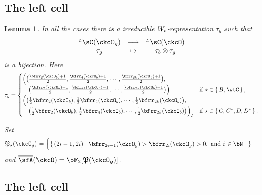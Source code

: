 \documentclass[12pt,a4paper]{amsart}
\def\abs#1{\left|{#1}\right|}
\newcommand{\CQ}{{\mathcal {Q}}}
\numberwithin{equation}{section}
\newtheorem{lem}[thm]{Lemma}
\theoremstyle{remark}
\def\half{{\tfrac{1}{2}}}
\def\WLamck{W_{[\lambda_{\ckcO}]}}
\def\LC{{}^{\scriptscriptstyle L}\sC}
\def\CQ{\overline{\sfA}}%
\def\CPP{\mathfrak{P}}
\def\CPPs{\mathfrak{P}_{\star}}
\begin{document}
  \subsection{The left cell}

\begin{lem}\label{lem:Lcell}
  In all the cases there is a irreducible $W_{b}$-representation $\tau_{b}$
  such that
  \[
    \begin{array}{ccc}
      \LC(\ckcO_{g}) & \longrightarrow & \LC(\ckcO)\\
      \tau_g & \mapsto & \tau_{b}\otimes \tau_{g}
    \end{array}
  \]
  is a bijection.
  Here
  \[
    \tau_{b} = \begin{cases}
      \Big( \big(\frac{\bfrr_{2}(\ckcO_{b})+1}{2}, \frac{\bfrr_{4}(\ckcO_{b})+1}{2}, \cdots, \frac{\bfrr_{2k}(\ckcO_{b})+1}{2}\big),\\
       \hspace{1em} \big(\frac{\bfrr_{2}(\ckcO_{b})-1}{2}, \frac{\bfrr_{4}(\ckcO_{b})-1}{2}, \cdots, \frac{\bfrr_{2k}(\ckcO_{b})-1}{2}\big)\Big)
      & \text{if } \star \in \set{B,\wtC},\\
      \Big( \big(\half\bfrr_{2}(\ckcO_{b}), \half\bfrr_{4}(\ckcO_{b}),\cdots, \half\bfrr_{2k}(\ckcO_{b})\big), \\
      \hspace{1em} \big(\half\bfrr_{2}(\ckcO_{b}), \half\bfrr_{4}(\ckcO_{b}),\cdots, \half\bfrr_{2k}(\ckcO_{b}) \big)\Big)_{I}
      & \text{if } \star \in \set{C,C^{*}, D,D^{*}}.\\
    \end{cases}
  \]


  Set
  \[
    \CPPs(\ckcO_{g}) =
    \begin{cases}
    \set{(2i-1,2i)| \bfrr_{2i-1}(\ckcO_{g})> \bfrr_{2i}(\ckcO_{g})>0, \text{
        and } i\in \bN^{+}}
    \end{cases}
  \]
  and $\CQ(\ckcO)= \bF_{2}[\CPP(\ckcO_{g})]$.


\end{lem}

\subsection{The left cell}
\end{document}
